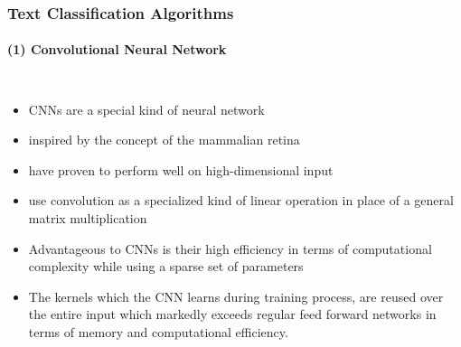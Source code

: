 \documentclass[10pt,usepdftitle=false,aspectratio=169]{beamer}
\begin{document}
\begin{frame}\frametitle{Text Classification Algorithms}
    \framesubtitle{(1) Convolutional Neural Network}

	\begin{columns}
	
		\vspace{2em}
		\begin{itemize}
			\item CNNs are a special kind of neural network
			\item inspired by the concept of the mammalian retina
			\item have proven to perform well on high-dimensional input 
			\item use convolution as a specialized kind of linear operation in place of a general matrix multiplication
			\item Advantageous to CNNs is their high efficiency in terms of  computational complexity while using a sparse set of parameters
			\item The kernels which the CNN learns during training process, are reused over the entire input which markedly exceeds regular feed forward networks in terms of memory and computational efficiency.


		\end{itemize}
		
		

		\end{columns}
	\end{frame}
\end{document}
